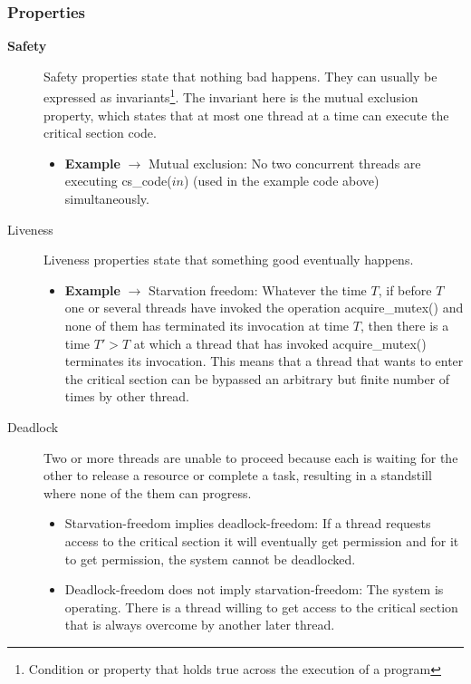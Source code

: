 \subsubsection{Properties}
\begin{description}
    \item[\textbf{Safety}] Safety properties state that nothing bad happens. They can usually be expressed as invariants\footnote{Condition or property that holds true across the execution of a program}. The invariant here is the mutual exclusion property, which states that at most one thread at a time can execute the critical section code.
    \begin{itemize}
        \item \textbf{Example} $\rightarrow$ Mutual exclusion: No two concurrent threads are executing cs\_code($in$) (used in the example code above) simultaneously.
    \end{itemize}
    \item[Liveness] Liveness properties state that something good eventually happens.
    \begin{itemize}
        \item \textbf{Example} $\rightarrow$ Starvation freedom: Whatever the time $T$, if before $T$ one or several threads have invoked the operation acquire\_mutex() and none of them has terminated its invocation at time $T$, then there is a time $T' > T$ at which a thread that has invoked acquire\_mutex() terminates its invocation. This means that a thread that wants to enter the critical section can be bypassed an arbitrary but finite number of times by other thread.
    \end{itemize}
%
\clearpage
%
    \item[Deadlock] Two or more threads are unable to proceed because each is waiting for the other to release a resource or complete a task, resulting in a standstill where none of the them can progress.
    \begin{itemize}
        \item Starvation-freedom implies deadlock-freedom: If a thread requests access to the critical section it will eventually get permission and for it to get permission, the system cannot be deadlocked.
        \item Deadlock-freedom does not imply starvation-freedom: The system is operating. There is a thread willing to get access to the critical section that is always overcome by another later thread.
    \end{itemize}
\end{description}
